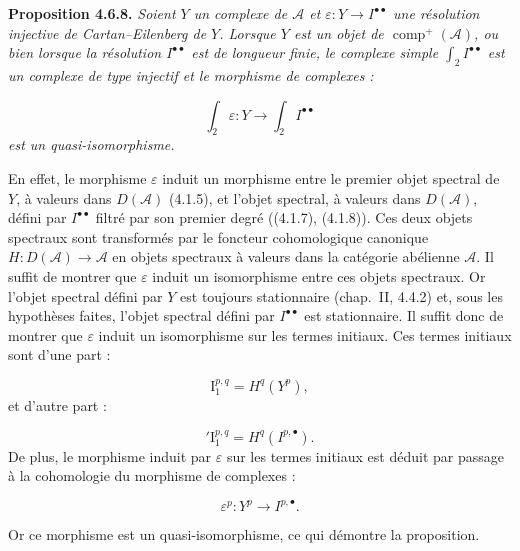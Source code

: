\clearpage
{}%
\begingroup\small\setlength{\parskip}{0pt}\setlength{\emergencystretch}{1.5em}
\setlength{\abovedisplayskip}{4pt plus 2pt minus 2pt}%
\setlength{\belowdisplayskip}{4pt plus 2pt minus 2pt}%

\noindent\textbf{Proposition 4.6.8.}\quad
\textit{Soient $Y$ un complexe de $\mathcal A$ et
$\varepsilon\colon Y\longrightarrow I^{\bullet\bullet}$ une résolution
injective de Cartan--Eilenberg de $Y$. Lorsque $Y$ est un objet de
$\operatorname{comp}^{+}(\mathcal A)$, ou bien lorsque la résolution
$I^{\bullet\bullet}$ est de longueur finie, le complexe simple
$\int_2 I^{\bullet\bullet}$ est un complexe de type injectif et le
morphisme de complexes :}

\[
\textit{$\int_2\varepsilon\colon
Y\longrightarrow\int_2 I^{\bullet\bullet}$}
\]
\textit{est un quasi-isomorphisme.}

En effet, le morphisme $\varepsilon$ induit un morphisme entre le premier
objet spectral de $Y$, à valeurs dans $D(\mathcal A)$ (4.1.5), et l'objet
spectral, à valeurs dans $D(\mathcal A)$, défini par
$I^{\bullet\bullet}$ filtré par son premier degré ((4.1.7), (4.1.8)). Ces
deux objets spectraux sont transformés par le foncteur cohomologique
canonique
$H\colon D(\mathcal A)\longrightarrow\mathcal A$ en objets spectraux à
valeurs dans la catégorie abélienne $\mathcal A$. Il suffit de montrer que
$\varepsilon$ induit un isomorphisme entre ces objets spectraux. Or l'objet
spectral défini par $Y$ est toujours stationnaire (chap.~II, 4.4.2) et,
sous les hypothèses faites, l'objet spectral défini par
$I^{\bullet\bullet}$ est stationnaire. Il suffit donc de montrer que
$\varepsilon$ induit un isomorphisme sur les termes initiaux. Ces termes
initiaux sont d'une part :

\[
\mathrm I_1^{p,q}=H^q(Y^p),
\]
et d'autre part :

\[
{}'\mathrm I_1^{p,q}=H^q(I^{p,\bullet}).
\]
De plus, le morphisme induit par $\varepsilon$ sur les termes initiaux est
déduit par passage à la cohomologie du morphisme de complexes :

\[
\varepsilon^p\colon Y^p\longrightarrow I^{p,\bullet}.
\]

Or ce morphisme est un quasi-isomorphisme, ce qui démontre la proposition.

